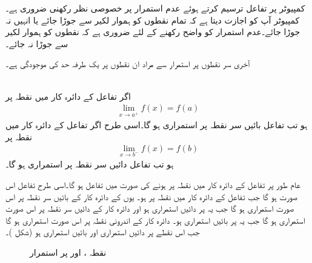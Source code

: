 \quad
کمپیوٹر پر تفاعل ترسیم کرتے ہوئے عدم استمرار پر خصوصی نظر رکھنی ضروری ہے۔کمپیوٹر آپ کو اجازت دیتا ہے کہ تمام نقطوں کو ہموار لکیر سے جوڑا جائے یا انہیں نہ جوڑا جائے۔عدم استمرار کو واضح رکھنے کے لئے ضروری ہے کہ نقطوں کو ہموار لکیر سے جوڑا نہ جائے۔

آخری سر نقطوں پر استمرار سے مراد ان نقطوں پر یک طرفہ حد کی موجودگی ہے۔ 

\\
اگر تفاعل  کے دائرہ کار میں نقطہ  پر
\begin{align*}
\lim_{x\to a^+}f(x)=f(a)
\end{align*}
ہو تب تفاعل بائیں سر نقطہ  پر استمراری ہو گا۔اسی طرح اگر تفاعل  کے دائرہ کار میں نقطہ  پر
\begin{align*}
\lim_{x\to b^-}f(x)=f(b)
\end{align*}
ہو تب تفاعل دائیں سر نقطہ  پر استمراری ہو گا۔

عام طور پر تفاعل  کے دائرہ کار میں نقطہ  پر  ہونے کی صورت میں تفاعل  ہو گا۔اسی طرح تفاعل  اس صورت  ہو گا جب تفاعل کے دائرہ کار میں نقطہ  پر  ہو۔ یوں  کے دائرہ کار کے بائیں سر نقطہ  پر  اس صورت استمراری ہو گا جب یہ  پر دائیں استمراری ہو اور دائرہ کار کے دائیں سر نقطہ   پر  اس صورت استمراری ہو گا جب یہ  پر بائیں استمراری ہو۔ دائرہ کار کے اندرونی نقطہ  پر  اس صورت استمراری ہو گا جب اس نقطے پر  دائیں استمراری اور بائیں استمراری ہو (شکل )۔
\begin{figure}
\centering
{}
\caption{
نقطہ ،  اور  پر استمرار
}
\label{شکل_حد_استمرار_تعریف}
\end{figure}

